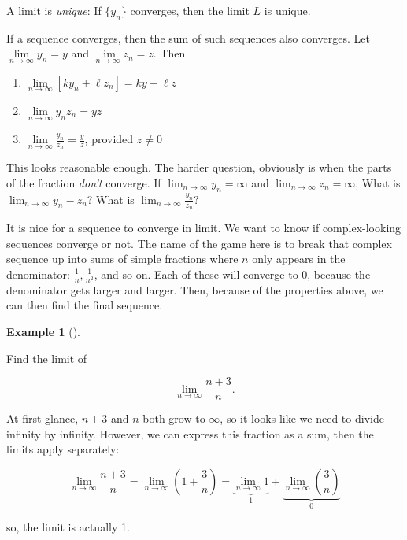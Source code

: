 \documentclass[
  letterpaper,
]{book}
\providecommand{\tightlist}{%
  \setlength{\itemsep}{0pt}\setlength{\parskip}{0pt}}\usepackage{longtable,booktabs,array}
\theoremstyle{definition}
\theoremstyle{definition}
\newtheorem{example}{Example}[chapter]
\theoremstyle{plain}
\theoremstyle{definition}
\theoremstyle{plain}
\theoremstyle{plain}
\theoremstyle{remark}
\begin{document}
A limit is \emph{unique}: If \(\{y_n\}\) converges, then the limit \(L\)
is unique.

If a sequence converges, then the sum of such sequences also converges.
Let \(\lim\limits_{n \to \infty} y_n = y\) and
\(\lim\limits_{n \to \infty} z_n =z\). Then

\begin{enumerate}
\def\labelenumi{\arabic{enumi}.}
\tightlist
\item
  \(\lim\limits_{n \to \infty} [k y_n + \ell z_n]= k y + \ell z\)
\item
  \(\lim\limits_{n \to \infty} y_n z_n = yz\)
\item
  \(\lim\limits_{n \to \infty} \frac{y_n}{z_n} = \frac{y}{z}\), provided
  \(z\neq 0\)
\end{enumerate}

This looks reasonable enough. The harder question, obviously is when the
parts of the fraction \emph{don't} converge. If
\(\lim_{n\to\infty} y_n = \infty\) and
\(\lim_{n\to\infty} z_n = \infty\), What is
\(\lim_{n\to\infty} y_n - z_n\)? What is
\(\lim_{n\to\infty} \frac{y_n}{z_n}\)?

It is nice for a sequence to converge in limit. We want to know if
complex-looking sequences converge or not. The name of the game here is
to break that complex sequence up into sums of simple fractions where
\(n\) only appears in the denominator: \(\frac{1}{n}, \frac{1}{n^2}\),
and so on. Each of these will converge to 0, because the denominator
gets larger and larger. Then, because of the properties above, we can
then find the final sequence.

\leavevmode{}%
\begin{example}[]\label{exm-limseq}

Find the limit of

\[\lim_{n\to \infty} \frac{n + 3}{n}.\]

At first glance, \(n + 3\) and \(n\) both grow to \(\infty\), so it
looks like we need to divide infinity by infinity. However, we can
express this fraction as a sum, then the limits apply separately:

\[\lim_{n\to \infty} \frac{n + 3}{n} = \lim_{n\to \infty} \left(1 + \frac{3}{n}\right) =  \underbrace{\lim_{n\to \infty}1}_{1} +  \underbrace{\lim_{n\to \infty}\left(\frac{3}{n}\right)}_{0}\]

so, the limit is actually 1.

\end{example}
\end{document}
